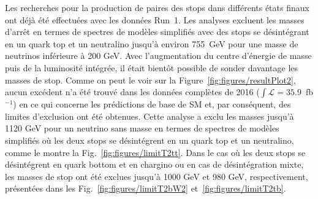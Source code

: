 
Les recherches pour la production de paires des stops dans différents états finaux ont déjà été effectuées avec les données Run~1. Les analyses excluent les masses d'arrêt en termes de spectres de modèles simplifiés avec des stops se désintégrant en un quark top et un neutralino jusqu'à environ 755~GeV pour une masse de neutrinos inférieure à 200 GeV. Avec l'augmentation du centre d'énergie de masse puis de la luminosité intégrée, il était bientôt possible de sonder davantage les masses de stop. Comme on peut le voir sur la Figure~\ref{fig:figures/resultPlot2}, aucun excédent n'a été trouvé dans les données complètes de 2016 ($ \int{\mathcal {L}} = 35.9 $~fb $^{-1} $) en ce qui concerne les prédictions de base de SM et, par conséquent, des limites d'exclusion ont été obtenues. Cette analyse a exclu les masses jusqu’à 1120 GeV pour un neutrino sans masse en termes de spectres de modèles simplifiés où les deux stops se désintégrent en un quark top et un neutralino, comme le montre la Fig.~\ref{fig:figures/limitT2tt}. Dans le cas où les deux stops se désintégrent en quark bottom et en chargino ou en cas de désintégration mixte, les masses de stop ont été exclues jusqu’à 1000 GeV et 980 GeV, respectivement, présentées dans les Fig.~\ref{fig:figures/limitT2bW2}  et~\ref{fig:figures/limitT2tb}.

